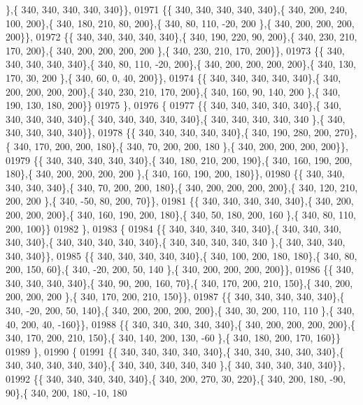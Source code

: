 \begin{DoxyCode}
      \},\{ 340, 340, 340, 340, 340\}\},
01971 \{\{ 340, 340, 340, 340, 340\},\{ 340, 200, 240, 100, 200\},\{ 340, 180, 210,  80, 200\},\{ 340,  80, 110, -20, 200
      \},\{ 340, 200, 200, 200, 200\}\},
01972 \{\{ 340, 340, 340, 340, 340\},\{ 340, 190, 220,  90, 200\},\{ 340, 230, 210, 170, 200\},\{ 340, 200, 200, 200, 200
      \},\{ 340, 230, 210, 170, 200\}\},
01973 \{\{ 340, 340, 340, 340, 340\},\{ 340,  80, 110, -20, 200\},\{ 340, 200, 200, 200, 200\},\{ 340, 130, 170,  30, 200
      \},\{ 340,  60,   0,  40, 200\}\},
01974 \{\{ 340, 340, 340, 340, 340\},\{ 340, 200, 200, 200, 200\},\{ 340, 230, 210, 170, 200\},\{ 340, 160,  90, 140, 200
      \},\{ 340, 190, 130, 180, 200\}\}
01975 \},
01976 \{
01977 \{\{ 340, 340, 340, 340, 340\},\{ 340, 340, 340, 340, 340\},\{ 340, 340, 340, 340, 340\},\{ 340, 340, 340, 340, 340
      \},\{ 340, 340, 340, 340, 340\}\},
01978 \{\{ 340, 340, 340, 340, 340\},\{ 340, 190, 280, 200, 270\},\{ 340, 170, 200, 200, 180\},\{ 340,  70, 200, 200, 180
      \},\{ 340, 200, 200, 200, 200\}\},
01979 \{\{ 340, 340, 340, 340, 340\},\{ 340, 180, 210, 200, 190\},\{ 340, 160, 190, 200, 180\},\{ 340, 200, 200, 200, 200
      \},\{ 340, 160, 190, 200, 180\}\},
01980 \{\{ 340, 340, 340, 340, 340\},\{ 340,  70, 200, 200, 180\},\{ 340, 200, 200, 200, 200\},\{ 340, 120, 210, 200, 200
      \},\{ 340, -50,  80, 200,  70\}\},
01981 \{\{ 340, 340, 340, 340, 340\},\{ 340, 200, 200, 200, 200\},\{ 340, 160, 190, 200, 180\},\{ 340,  50, 180, 200, 160
      \},\{ 340,  80, 110, 200, 100\}\}
01982 \},
01983 \{
01984 \{\{ 340, 340, 340, 340, 340\},\{ 340, 340, 340, 340, 340\},\{ 340, 340, 340, 340, 340\},\{ 340, 340, 340, 340, 340
      \},\{ 340, 340, 340, 340, 340\}\},
01985 \{\{ 340, 340, 340, 340, 340\},\{ 340, 100, 200, 180, 180\},\{ 340,  80, 200, 150,  60\},\{ 340, -20, 200,  50, 140
      \},\{ 340, 200, 200, 200, 200\}\},
01986 \{\{ 340, 340, 340, 340, 340\},\{ 340,  90, 200, 160,  70\},\{ 340, 170, 200, 210, 150\},\{ 340, 200, 200, 200, 200
      \},\{ 340, 170, 200, 210, 150\}\},
01987 \{\{ 340, 340, 340, 340, 340\},\{ 340, -20, 200,  50, 140\},\{ 340, 200, 200, 200, 200\},\{ 340,  30, 200, 110, 110
      \},\{ 340,  40, 200,  40, -160\}\},
01988 \{\{ 340, 340, 340, 340, 340\},\{ 340, 200, 200, 200, 200\},\{ 340, 170, 200, 210, 150\},\{ 340, 140, 200, 130, -60
      \},\{ 340, 180, 200, 170, 160\}\}
01989 \},
01990 \{
01991 \{\{ 340, 340, 340, 340, 340\},\{ 340, 340, 340, 340, 340\},\{ 340, 340, 340, 340, 340\},\{ 340, 340, 340, 340, 340
      \},\{ 340, 340, 340, 340, 340\}\},
01992 \{\{ 340, 340, 340, 340, 340\},\{ 340, 200, 270,  30, 220\},\{ 340, 200, 180, -90,  90\},\{ 340, 200, 180, -10, 180

\end{DoxyCode}
